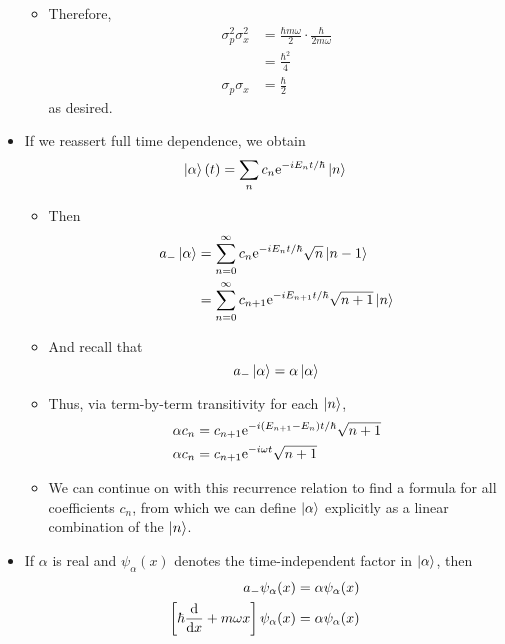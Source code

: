 \documentclass[../notes.tex]{subfiles}
\begin{document}
\begin{itemize}
\begin{itemize}
        \item Therefore,
        \begin{align*}
            \sigma_p^2\sigma_x^2 &= \frac{\hbar m\omega}{2}\cdot\frac{\hbar}{2m\omega}\\
            &= \frac{\hbar^2}{4}\\
            \sigma_p\sigma_x &= \frac{\hbar}{2}
        \end{align*}
        as desired.
    \end{itemize}
    \item If we reassert full time dependence, we obtain
    \begin{equation*}
        \ket{\alpha}(t) = \sum_nc_n\e[-iE_nt/\hbar]\ket{n}
    \end{equation*}
    \begin{itemize}
        \item Then
        \begin{align*}
            a_-\ket{\alpha} &= \sum_{n=0}^\infty c_n\e[-iE_nt/\hbar]\sqrt{n}\ket{n-1}\\
            &= \sum_{n=0}^\infty c_{n+1}\e[-iE_{n+1}t/\hbar]\sqrt{n+1}\ket{n}
        \end{align*}
        \item And recall that
        \begin{equation*}
            a_-\ket{\alpha} = \alpha\ket{\alpha}
        \end{equation*}
        \item Thus, via term-by-term transitivity for each $\ket{n}$,
        \begin{align*}
            \alpha c_n &= c_{n+1}\e[-i(E_{n+1}-E_n)t/\hbar]\sqrt{n+1}\\
            \alpha c_n &= c_{n+1}\e[-i\omega t]\sqrt{n+1}
        \end{align*}
        \item We can continue on with this recurrence relation to find a formula for all coefficients $c_n$, from which we can define $\ket{\alpha}$ explicitly as a linear combination of the $\ket{n}$.
    \end{itemize}
    \item If $\alpha$ is real and $\psi_\alpha(x)$ denotes the time-independent factor in $\ket{\alpha}$, then
    \begin{align*}
        a_-\psi_\alpha(x) &= \alpha\psi_\alpha(x)\\
        \left[ \hbar\dv{x}+m\omega x \right]\psi_\alpha(x) &= \alpha\psi_\alpha(x)
    \end{align*}

\end{itemize}
\end{document}
